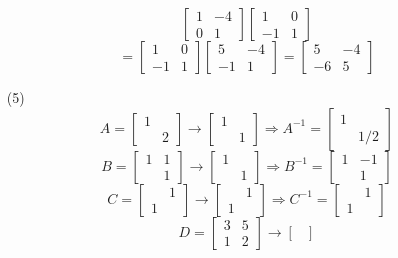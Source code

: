 \documentclass[12pt]{article}
\begin{document}
\begin{itemize}
$$\begin{bmatrix}
1 & -4 \\
0 & 1
\end{bmatrix}\begin{bmatrix}
1 & 0 \\
-1 & 1
\end{bmatrix}$$
$$= \begin{bmatrix}
1 & 0 \\
-1 & 1
\end{bmatrix}\begin{bmatrix}
5 & -4 \\
-1 & 1
\end{bmatrix} = \begin{bmatrix}
5 & -4 \\
-6 & 5
\end{bmatrix}$$
\item[(5)]
$$A = \begin{bmatrix}
1 & \\
& 2
\end{bmatrix} \rightarrow \begin{bmatrix}
1 & \\
& 1
\end{bmatrix} \Rightarrow A^{-1} = \begin{bmatrix}
1 & \\
& 1/2
\end{bmatrix} $$
$$B = \begin{bmatrix}
1 & 1 \\
& 1
\end{bmatrix} \rightarrow \begin{bmatrix}
1 & \\
& 1
\end{bmatrix} \Rightarrow B^{-1} = \begin{bmatrix}
1 & -1 \\
& 1
\end{bmatrix}$$
$$C = \begin{bmatrix}
& 1 \\
1 &
\end{bmatrix} \rightarrow \begin{bmatrix}
& 1 \\
1 &
\end{bmatrix} \Rightarrow C^{-1} = \begin{bmatrix}
& 1 \\
1 &
\end{bmatrix}$$
$$D = \begin{bmatrix}
3 & 5 \\
1 & 2
\end{bmatrix} \rightarrow \begin{bmatrix}

\end{bmatrix}$$
\end{itemize}
\end{document}
